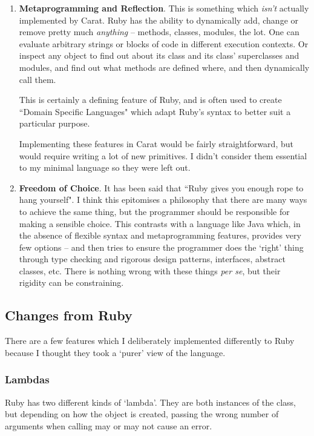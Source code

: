 \begin{enumerate}
  \item \textbf{Metaprogramming and Reflection}. This is something which \emph{isn't} actually implemented by Carat. Ruby has the ability to dynamically add, change or remove pretty much \emph{anything} -- methods, classes, modules, the lot. One can evaluate arbitrary strings or blocks of code in different execution contexts. Or inspect any object to find out about its class and its class' superclasses and modules, and find out what methods are defined where, and then dynamically call them.
  
  This is certainly a defining feature of Ruby, and is often used to create ``Domain Specific Languages" which adapt Ruby's syntax to better suit a particular purpose.
  
  Implementing these features in Carat would be fairly straightforward, but would require writing a lot of new primitives. I didn't consider them essential to my minimal language so they were left out.
  
  \item \textbf{Freedom of Choice}. It has been said that ``Ruby gives you enough rope to hang yourself". I think this epitomises a philosophy that there are many ways to achieve the same thing, but the programmer should be responsible for making a sensible choice. This contrasts with a language like Java which, in the absence of flexible syntax and metaprogramming features, provides very few options -- and then tries to ensure the programmer does the `right' thing through type checking and rigorous design patterns, interfaces, abstract classes, etc. There is nothing wrong with these things \emph{per se}, but their rigidity can be constraining.
\end{enumerate}

\subsection{Changes from Ruby}
\label{sec:ruby_comparison}

There are a few features which I deliberately implemented differently to Ruby because I thought they took a `purer' view of the language.

\subsubsection{Lambdas}

Ruby has two different kinds of `lambda'. They are both instances of the  class, but depending on how the object is created, passing the wrong number of arguments when calling may or may not cause an error.

